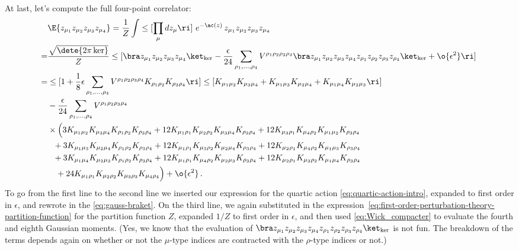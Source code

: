At last,
let's compute the full four-point correlator: 
\begin{align}\label{eq:full-four-point-intro}
&\E{z_{\mu_1}z_{\mu_2}z_{\mu_3}z_{\mu_4}} =\frac{1}{Z}\int \le[\prod_{\mu}d z_{\mu}\ri]\ e^{-\ac(z)}\,  z_{\mu_1}z_{\mu_2}z_{\mu_3}z_{\mu_4}\, \\
=&\frac{\sqrt{\dete{2\pi\ker}}}{Z}\le[\bra z_{\mu_1}z_{\mu_2}z_{\mu_3}z_{\mu_4}\ket_{\ker}-\frac{\epsilon}{24}\sum_{\rho_1,\ldots,\rho_4}V^{\rho_1\rho_2\rho_3\rho_4}\bra z_{\mu_1}z_{\mu_2}z_{\mu_3}z_{\mu_4}z_{\rho_1}z_{\rho_2}z_{\rho_3}z_{\rho_4}\ket_{\ker}+\o{\epsilon^2}\ri]\, \nonumber\\
=&\le[1+\frac{1}{8}\epsilon  \sum_{\rho_1,\ldots,\rho_4}V^{\rho_1\rho_2\rho_3\rho_4} K_{\rho_1\rho_2}K_{\rho_3\rho_4}\ri]\le[K_{\mu_1\mu_2}K_{\mu_3\mu_4}+K_{\mu_1\mu_3}K_{\mu_2\mu_4}+K_{\mu_1\mu_4}K_{\mu_2\mu_3}\ri]\, \nonumber\\
&-\frac{\epsilon}{24}\sum_{\rho_1,\ldots,\rho_4}V^{\rho_1\rho_2\rho_3\rho_4} \nonumber\\
 &\times\Big(3K_{\mu_1\mu_2}K_{\mu_3\mu_4}K_{\rho_1\rho_2}K_{\rho_3\rho_4}+12K_{\mu_1\rho_1}K_{\mu_2\rho_2}K_{\mu_3\mu_4}K_{\rho_3\rho_4}+12K_{\mu_3\rho_1}K_{\mu_4\rho_2}K_{\mu_1\mu_2}K_{\rho_3\rho_4}\, \nonumber\\
 &\ \ +3K_{\mu_1\mu_3}K_{\mu_2\mu_4}K_{\rho_1\rho_2}K_{\rho_3\rho_4}+12K_{\mu_1\rho_1}K_{\mu_3\rho_2}K_{\mu_2\mu_4}K_{\rho_3\rho_4}+12K_{\mu_2\rho_1}K_{\mu_4\rho_2}K_{\mu_1\mu_3}K_{\rho_3\rho_4}\, \nonumber\\
  &\ \ +3K_{\mu_1\mu_4}K_{\mu_2\mu_3}K_{\rho_1\rho_2}K_{\rho_3\rho_4}+12K_{\mu_1\rho_1}K_{\mu_4\rho_2}K_{\mu_2\mu_3}K_{\rho_3\rho_4}+12K_{\mu_2\rho_1}K_{\mu_3\rho_2}K_{\mu_1\mu_4}K_{\rho_3\rho_4}\, \nonumber\\
 &\quad +24K_{\mu_1\rho_1}K_{\mu_2\rho_2}K_{\mu_3\rho_3}K_{\mu_4\rho_4}\Big)+\o{\epsilon^2}  \, .\nonumber
\end{align}
To go from the first line to the second line we inserted our expression for the quartic action \eqref{eq:quartic-action-intro}, expanded to first order in $\epsilon$, and rewrote in the  \eqref{eq:gauss-braket}. On the third line, we again substituted in the expression~\eqref{eq:first-order-perturbation-theory-partition-function} for the partition function $Z$, expanded $1/Z$ to first order in $\epsilon$, and then used  \eqref{eq:Wick_compacter} to evaluate the fourth and eighth Gaussian moments. (Yes, we know that the evaluation of $\bra z_{\mu_1}z_{\mu_2}z_{\mu_3}z_{\mu_4}z_{\rho_1}z_{\rho_2}z_{\rho_3}z_{\rho_4}\ket_{\ker}$ is not fun. The breakdown of the terms depends again on whether or not the $\mu$-type indices are contracted with the $\rho$-type indices or not.)
